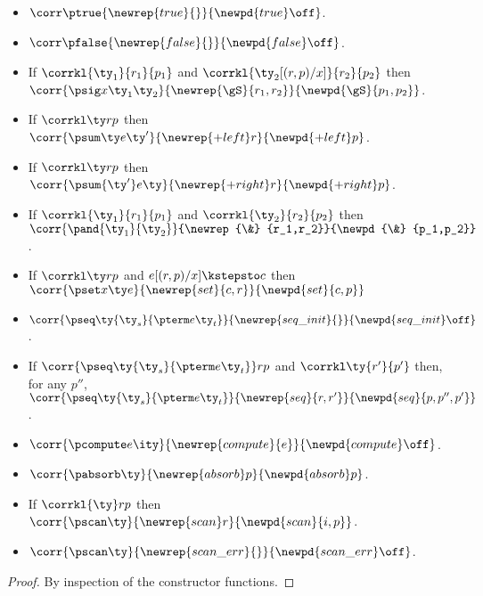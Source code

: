 \begin{lemma}
  \label{lem:cons-props}
  \begin{itemize}
  \item $\corr \ptrue {\newrep {true} {}} {\newpd {true} \off}$.
  \item $\corr \pfalse {\newrep {false} {}} {\newpd {false} \off}$.
  \item If $\corrkl {\ty_1} {r_1} {p_1}$ and $\corrkl {\ty_2[(r,p)/x]} {r_2} {p_2}$
    then\\ $\corr {\psig x {\ty_1} {\ty_2}}
    {\newrep {\gS} {r_1,r_2}}{\newpd {\gS} {p_1,p_2}}$.
  \item If $\corrkl \ty r p$ then $\corr {\psum \ty e {\ty'}} 
      {\newrep {+left} r} {\newpd {+left} p}$.
  \item If $\corrkl \ty r p$ then $\corr {\psum {\ty'} e \ty} 
      {\newrep {+right} r} {\newpd {+right} p}$.
  \item If $\corrkl {\ty_1} {r_1} {p_1}$ and $\corrkl {\ty_2} {r_2} {p_2}$
    then\\ $\corr {\pand {\ty_1} {\ty_2}}
    {\newrep {\&} {r_1,r_2}}{\newpd {\&} {p_1,p_2}}$.
  \item If $\corrkl \ty r p$ and $e[(r,p)/x] \kstepsto c$ then\\ $\corr {\pset x \ty e} 
    {\newrep {set} {c,r}} {\newpd {set} {c,p}}$
  \item $\corr {\pseq \ty {\ty_s}{\pterm e {\ty_t}}} 
    {\newrep {seq\_init} {}} {\newpd {seq\_init} \off}$.
  \item If $\corr {\pseq \ty {\ty_s} {\pterm e {\ty_t}}} r p$ and
    $\corrkl \ty {r'} {p'}$ then, for any $p''$,\\
    $\corr {\pseq \ty {\ty_s}{\pterm e {\ty_t}}}
    {\newrep {seq} {r,r'}} {\newpd {seq} {p,p'',p'}}$.    
  \item $\corr {\pcompute e \ity} {\newrep {compute} {e}} {\newpd {compute} \off}$.
  \item $\corr {\pabsorb \ty} {\newrep {absorb} p} {\newpd {absorb} p}$.
  \item If $\corrkl {\ty} r p$ then $\corr {\pscan \ty} 
      {\newrep {scan} r} {\newpd {scan} {i,p}}$.
  \item $\corr {\pscan \ty} 
      {\newrep {scan\_err} {}} {\newpd {scan\_err} \off}$.
  \end{itemize}
\end{lemma}

\begin{proof}
  By inspection of the constructor functions. 
\end{proof}

